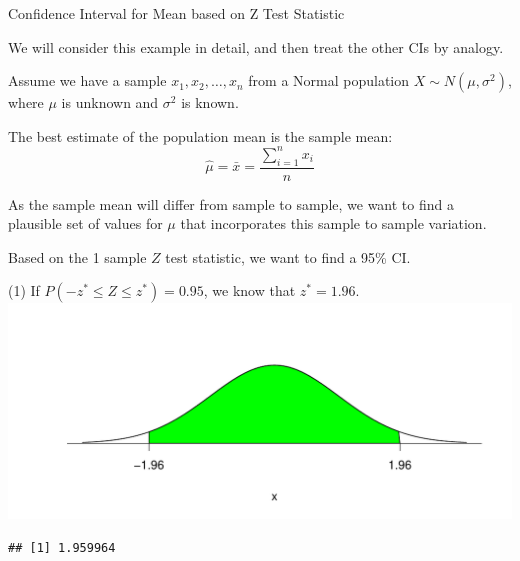 \documentclass[t,xcolor=pdftex,dvipsnames,table]{beamer}
\makeatletter
\def\maxwidth{ %
  \ifdim\Gin@nat@width>\linewidth
    \linewidth
  \else
    \Gin@nat@width
  \fi
}
\newenvironment{kframe}{%
 \def\at@end@of@kframe{}%
 \ifinner\ifhmode%
  \def\at@end@of@kframe{\end{minipage}}%
  \begin{minipage}{\columnwidth}%
 \fi\fi%
 \def\FrameCommand##1{\hskip\@totalleftmargin \hskip-\fboxsep
 \colorbox{shadecolor}{##1}\hskip-\fboxsep
     \hskip-\linewidth \hskip-\@totalleftmargin \hskip\columnwidth}%
 \MakeFramed {\advance\hsize-\width
   \@totalleftmargin\z@ \linewidth\hsize
   \@setminipage}}%
 {\par\unskip\endMakeFramed%
 \at@end@of@kframe}
\newenvironment{knitrout}{}{} %
\makeatother
\begin{document}
\begin{frame}[fragile]{Confidence Interval for Mean based on Z Test Statistic}

We will consider this example in detail, and then treat the other CIs by analogy.

\vspace{.5cm}
Assume we have a sample $x_{1}, x_{2}, \ldots, x_{n}$ from a Normal population $X \sim N(\mu, \sigma^2)$, where $\mu$ is unknown and $\sigma^2$ is known.

\vspace{.5cm}
The best estimate of the population mean is the sample mean:
\[ \hat{\mu} = \bar{x} = \frac{\sum_{i=1}^n x_{i}}{n} \]

\vspace{.5cm}
As the sample mean will differ from sample to sample, we want to find a plausible set of values for $\mu$ that incorporates this sample to sample variation.

\end{frame}

\begin{frame}[fragile]{}

Based on the 1 sample $Z$ test statistic, we want to find a 95\% CI. 

\vspace{.5cm}
(1) If $P(-z^{*} \leq Z \leq z^{*}) = 0.95$, we know that $z^{*} = 1.96$. \\


\begin{knitrout}
\color{fgcolor}
\includegraphics[width=\maxwidth]{figure/unnamed-chunk-5-1} 
\begin{kframe}\begin{verbatim}
## [1] 1.959964
\end{verbatim}
\end{kframe}
\end{knitrout}
\end{frame}
\end{document}
